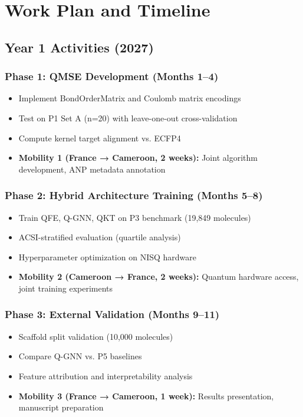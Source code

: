 \documentclass[11pt,a4paper]{article}
\begin{document}
\section{Work Plan and Timeline}

\subsection{Year 1 Activities (2027)}

\subsubsection{Phase 1: QMSE Development (Months 1--4)}
\begin{itemize}
    \item Implement BondOrderMatrix and Coulomb matrix encodings
    \item Test on P1 Set A (n=20) with leave-one-out cross-validation
    \item Compute kernel target alignment vs. ECFP4
    \item \textbf{Mobility 1 (France → Cameroon, 2 weeks):} Joint algorithm development, ANP metadata annotation
\end{itemize}

\subsubsection{Phase 2: Hybrid Architecture Training (Months 5--8)}
\begin{itemize}
    \item Train QFE, Q-GNN, QKT on P3 benchmark (19,849 molecules)
    \item ACSI-stratified evaluation (quartile analysis)
    \item Hyperparameter optimization on NISQ hardware
    \item \textbf{Mobility 2 (Cameroon → France, 2 weeks):} Quantum hardware access, joint training experiments
\end{itemize}

\subsubsection{Phase 3: External Validation (Months 9--11)}
\begin{itemize}
    \item Scaffold split validation (10,000 molecules)
    \item Compare Q-GNN vs. P5 baselines
    \item Feature attribution and interpretability analysis
    \item \textbf{Mobility 3 (France → Cameroon, 1 week):} Results presentation, manuscript preparation
\end{itemize}
\end{document}

